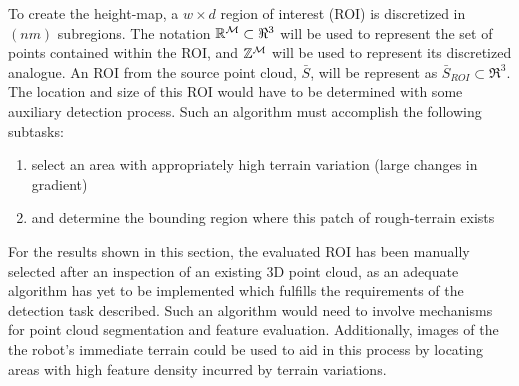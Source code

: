 			To create the height-map, a $w\times d$ region of interest (ROI) is discretized in $(nm)$ subregions. The notation ${\Bbb R}^{{\cal M}}\subset \Re^{3}$ will be used to represent the set of points contained within the ROI, and ${\Bbb Z}^{{\cal M}}$ will be used to represent its discretized analogue. An ROI from the source point cloud, $\bar{S}$, will be represent as $\bar{S}_{ROI}\subset\Re^{3}$. The location and size of this ROI would have to be determined with some auxiliary detection process. Such an algorithm must accomplish the following subtasks:
			\begin{enumerate}
				\item select an area with appropriately high terrain variation (large changes in gradient)
				\item and determine the bounding region where this patch of rough-terrain exists
			\end{enumerate}
			For the results shown in this section, the evaluated ROI has been manually selected after an inspection of an existing 3D point cloud, as an adequate algorithm has yet to be implemented which fulfills the requirements of the detection task described. Such an algorithm would need to involve mechanisms for point cloud segmentation and feature evaluation. Additionally, images of the the robot's immediate terrain could be used to aid in this process by locating areas with high feature density incurred by terrain variations.

